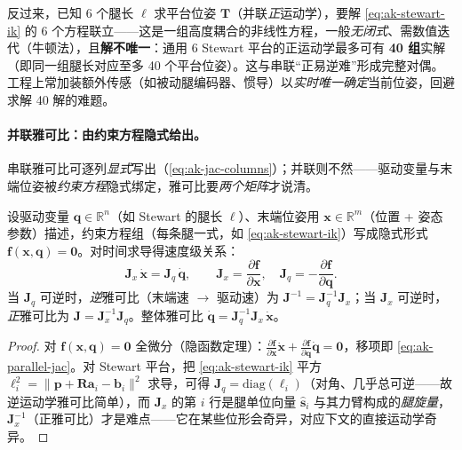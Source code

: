 \begin{insight}\label{ins:ak-parallel-fk}
反过来，已知 6 个腿长 $\boldsymbol{\ell}$ 求平台位姿 $\mathbf{T}$（并联\emph{正}运动学），要解 \cref{eq:ak-stewart-ik} 的 6 个方程联立——这是一组高度耦合的非线性方程，一般\emph{无闭式}、需数值迭代（牛顿法），且\textbf{解不唯一}：通用 6 Stewart 平台的正运动学最多可有 \textbf{40 组}实解\cite{merlet2006parallel}（即同一组腿长对应至多 40 个平台位姿）。这与串联“正易逆难”形成完整对偶。工程上常加装额外传感（如被动腿编码器、惯导）以\emph{实时唯一确定}当前位姿，回避求解 40 解的难题。
\end{insight}

\paragraph{并联雅可比：由约束方程隐式给出。}
串联雅可比可逐列\emph{显式}写出（\cref{eq:ak-jac-columns}）；并联则不然——驱动变量与末端位姿被\emph{约束方程}隐式绑定，雅可比要\emph{两个矩阵}才说清。

\begin{theorem}[并联机构的隐式雅可比]\label{thm:ak-parallel-jac}
设驱动变量 $\mathbf{q}\in\mathbb{R}^n$（如 Stewart 的腿长 $\boldsymbol{\ell}$）、末端位姿用 $\mathbf{x}\in\mathbb{R}^m$（位置 + 姿态参数）描述，约束方程组（每条腿一式，如 \cref{eq:ak-stewart-ik}）写成隐式形式 $\mathbf{f}(\mathbf{x},\mathbf{q})=\mathbf{0}$。对时间求导得速度级关系\cite{merlet2006parallel}：
\begin{equation}
  \boxed{\;\mathbf{J}_x\,\dot{\mathbf{x}}=\mathbf{J}_q\,\dot{\mathbf{q}},\qquad
  \mathbf{J}_x=\frac{\partial\mathbf{f}}{\partial\mathbf{x}},\quad
  \mathbf{J}_q=-\frac{\partial\mathbf{f}}{\partial\mathbf{q}}.\;}
  \label{eq:ak-parallel-jac}
\end{equation}
当 $\mathbf{J}_q$ 可逆时，\emph{逆}雅可比（末端速 $\to$ 驱动速）为 $\mathbf{J}^{-1}=\mathbf{J}_q^{-1}\mathbf{J}_x$；当 $\mathbf{J}_x$ 可逆时，\emph{正}雅可比为 $\mathbf{J}=\mathbf{J}_x^{-1}\mathbf{J}_q$。整体雅可比 $\dot{\mathbf{q}}=\mathbf{J}_q^{-1}\mathbf{J}_x\,\dot{\mathbf{x}}$。
\end{theorem}
\begin{proof}
对 $\mathbf{f}(\mathbf{x},\mathbf{q})=\mathbf{0}$ 全微分（隐函数定理）：$\frac{\partial\mathbf{f}}{\partial\mathbf{x}}\dot{\mathbf{x}}+\frac{\partial\mathbf{f}}{\partial\mathbf{q}}\dot{\mathbf{q}}=\mathbf{0}$，移项即 \cref{eq:ak-parallel-jac}。对 Stewart 平台，把 \cref{eq:ak-stewart-ik} 平方 $\ell_i^2=\|\mathbf{p}+\mathbf{R}\mathbf{a}_i-\mathbf{b}_i\|^2$ 求导，可得 $\mathbf{J}_q=\mathrm{diag}(\ell_i)$（对角、几乎总可逆——故逆运动学雅可比简单），而 $\mathbf{J}_x$ 的第 $i$ 行是腿单位向量 $\hat{\mathbf{s}}_i$ 与其力臂构成的\emph{腿旋量}，$\mathbf{J}_x^{-1}$（正雅可比）才是难点——它在某些位形会奇异，对应下文的直接运动学奇异。
\end{proof}

